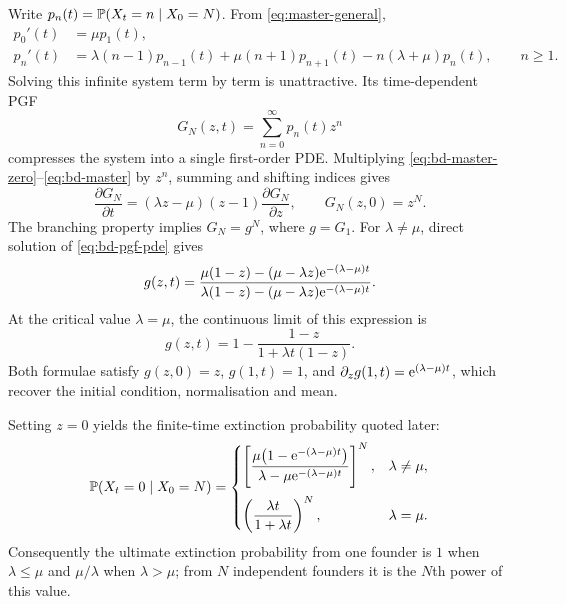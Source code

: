 Write \(p_n(t)=\mathbb{P}(X_t=n\mid X_0=N)\).  From
\eqref{eq:master-general},
\begin{align}
  p_0'(t)&=\mu p_1(t),
  \label{eq:bd-master-zero}\\
  p_n'(t)&=\lambda(n-1)p_{n-1}(t)
  +\mu(n+1)p_{n+1}(t)-n(\lambda+\mu)p_n(t),
  \qquad n\geq1.
  \label{eq:bd-master}
\end{align}
Solving this infinite system term by term is unattractive.  Its time-dependent
PGF
\[
  G_N(z,t)=\sum_{n=0}^{\infty}p_n(t)z^n
\]
compresses the system into a single first-order PDE.  Multiplying
\eqref{eq:bd-master-zero}--\eqref{eq:bd-master} by \(z^n\), summing and shifting
indices gives
\begin{equation}
  \frac{\partial G_N}{\partial t}
  =(\lambda z-\mu)(z-1)\frac{\partial G_N}{\partial z},
  \qquad G_N(z,0)=z^N.
  \label{eq:bd-pgf-pde}
\end{equation}
The branching property implies \(G_N=g^N\), where \(g=G_1\).  For
\(\lambda\neq\mu\), direct solution of \eqref{eq:bd-pgf-pde} gives
\begin{equation}
  g(z,t)=
  \frac{\mu(1-z)-(\mu-\lambda z)\mathrm{e}^{-(\lambda-\mu)t}}
       {\lambda(1-z)-(\mu-\lambda z)\mathrm{e}^{-(\lambda-\mu)t}}.
  \label{eq:bd-pgf-solution}
\end{equation}
At the critical value \(\lambda=\mu\), the continuous limit of this expression is
\begin{equation}
  g(z,t)=1-\frac{1-z}{1+\lambda t(1-z)}.
  \label{eq:bd-pgf-critical}
\end{equation}
Both formulae satisfy \(g(z,0)=z\), \(g(1,t)=1\), and
\(\partial_zg(1,t)=\mathrm{e}^{(\lambda-\mu)t}\), which recover the initial condition,
normalisation and mean.

Setting \(z=0\) yields the finite-time extinction probability quoted later:
\begin{equation}
  \mathbb{P}(X_t=0\mid X_0=N)=
  \begin{cases}
    \displaystyle
    \left[
      \frac{\mu\bigl(1-\mathrm{e}^{-(\lambda-\mu)t}\bigr)}
           {\lambda-\mu\mathrm{e}^{-(\lambda-\mu)t}}
    \right]^N,
    &\lambda\neq\mu,\\[14pt]
    \displaystyle
    \left(\frac{\lambda t}{1+\lambda t}\right)^N,
    &\lambda=\mu.
  \end{cases}
  \label{eq:p0t}
\end{equation}
Consequently the ultimate extinction probability from one founder is \(1\) when
\(\lambda\leq\mu\) and \(\mu/\lambda\) when \(\lambda>\mu\); from \(N\)
independent founders it is the \(N\)th power of this value.

